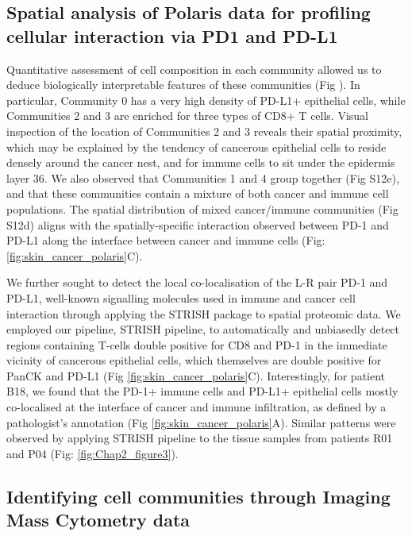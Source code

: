 \subsection{Spatial analysis of Polaris data for profiling cellular interaction via PD1 and PD-L1}
Quantitative assessment of cell composition in each community allowed us to deduce biologically interpretable features of these communities (Fig ). In particular, Community 0 has a very high density of PD-L1+ epithelial cells, while Communities 2 and 3 are enriched for three types of CD8+ T cells. Visual inspection of the location of Communities 2 and 3 reveals their spatial proximity, which may be explained by the tendency of cancerous epithelial cells to reside densely around the cancer nest, and for immune cells to sit under the epidermis layer 36. We also observed that Communities 1 and 4 group together (Fig S12e), and that these communities contain a mixture of both cancer and immune cell populations. The spatial distribution of mixed cancer/immune communities (Fig S12d) aligns with the spatially-specific interaction observed between PD-1 and PD-L1 along the interface between cancer and immune cells (Fig: \ref{fig:skin_cancer_polaris}C).

We further sought to detect the local co-localisation of the L-R pair PD-1 and PD-L1, well-known signalling molecules used in immune and cancer cell interaction \cite{pardoll2012blockade} through applying the STRISH package to spatial proteomic data.  We employed our pipeline, STRISH pipeline, to automatically and unbiasedly detect regions containing T-cells double positive for CD8 and PD-1 in the immediate vicinity of cancerous epithelial cells, which themselves are double positive for PanCK and PD-L1 (Fig \ref{fig:skin_cancer_polaris}C). Interestingly, for patient B18, we found that the PD-1+ immune cells and PD-L1+ epithelial cells mostly co-localised at the interface of cancer and immune infiltration, as defined by a pathologist’s annotation (Fig \ref{fig:skin_cancer_polaris}A). Similar patterns were observed by applying STRISH pipeline to the tissue samples from patients R01 and P04 (Fig: \ref{fig:Chap2_figure3}). 


\subsection{Identifying cell communities through Imaging Mass Cytometry data}
